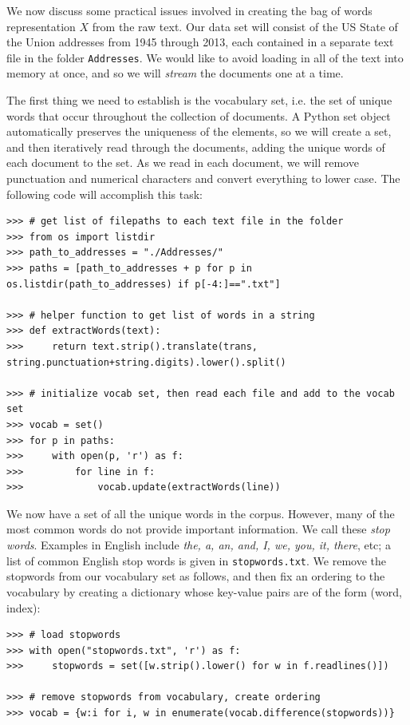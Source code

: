 We now discuss some practical issues involved in creating the bag of words representation $X$ from the raw text.
Our data set will consist of the US State of the Union addresses from 1945 through 2013, each contained in a separate text file in the folder {\tt Addresses}.
We would like to avoid loading in all of the text into memory at once, and so we will \emph{stream} the documents one at a time.

The first thing we need to establish is the vocabulary set, i.e. the set of unique words that occur throughout the collection of documents.
A Python set object automatically preserves the uniqueness of the elements, so we will create a set, and then iteratively read through the documents, adding the unique words of each
document to the set. As we read in each document, we will remove punctuation and numerical characters and convert everything to lower case.
The following code will accomplish this task:
\begin{lstlisting}
>>> # get list of filepaths to each text file in the folder
>>> from os import listdir
>>> path_to_addresses = "./Addresses/"
>>> paths = [path_to_addresses + p for p in os.listdir(path_to_addresses) if p[-4:]==".txt"]

>>> # helper function to get list of words in a string
>>> def extractWords(text):
>>>     return text.strip().translate(trans, string.punctuation+string.digits).lower().split()

>>> # initialize vocab set, then read each file and add to the vocab set
>>> vocab = set()
>>> for p in paths:
>>>     with open(p, 'r') as f:
>>>         for line in f:
>>>             vocab.update(extractWords(line))
\end{lstlisting}

We now have a set of all the unique words in the corpus. However, many of the most common words do not provide important information.
We call these \emph{stop words}. Examples in English include \emph{the, a, an, and, I, we, you, it, there}, etc;
a list of common English stop words is given in {\tt stopwords.txt}. 
We remove the stopwords from our vocabulary set as follows, and then fix an ordering to the vocabulary by creating a dictionary
whose key-value pairs are of the form (word, index):
\begin{lstlisting}
>>> # load stopwords
>>> with open("stopwords.txt", 'r') as f:
>>>     stopwords = set([w.strip().lower() for w in f.readlines()])

>>> # remove stopwords from vocabulary, create ordering
>>> vocab = {w:i for i, w in enumerate(vocab.difference(stopwords))}
\end{lstlisting}

